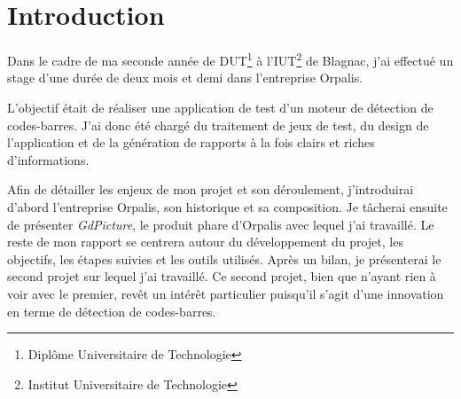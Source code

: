 \chapter*{Introduction}

Dans le cadre de ma seconde année de DUT\footnote{Diplôme Universitaire de Technologie} à l'IUT\footnote{Institut Universitaire de Technologie} de Blagnac, j'ai effectué un stage d'une durée de deux mois et demi dans l'entreprise Orpalis.

L'objectif était de réaliser une application de test d'un moteur de détection de codes-barres. J'ai donc été chargé du traitement de jeux de test, du design de l'application et de la génération de rapports à la fois clairs et riches d'informations.

Afin de détailler les enjeux de mon projet et son déroulement, j'introduirai d'abord l'entreprise Orpalis, son historique et sa composition. Je tâcherai ensuite de présenter \emph{GdPicture}, le produit phare d'Orpalis avec lequel j'ai travaillé. Le reste de mon rapport se centrera autour du développement du projet, les objectifs, les étapes suivies et les outils utilisés. Après un bilan, je présenterai le second projet sur lequel j'ai travaillé. Ce second projet, bien que n'ayant rien à voir avec le premier, revêt un intérêt particulier puisqu'il s'agit d'une innovation en terme de détection de codes-barres.